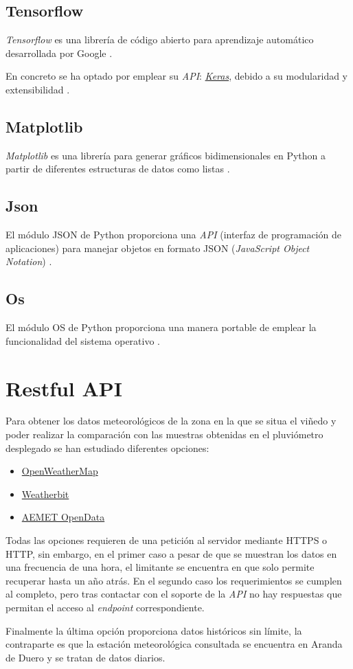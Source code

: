 \subsection{Tensorflow}
\textit{Tensorflow} es una librería de código abierto para aprendizaje automático desarrollada
por Google \cite{eswiki:tensorflow2021}.

En concreto se ha optado por emplear su \textit{API}: \href{https://keras.io/}{\textit{Keras}}, 
debido a su modularidad y extensibilidad \cite{eswiki:keras2022}.

\subsection{Matplotlib}
\textit{Matplotlib} es una librería para generar gráficos bidimensionales en Python a partir de 
diferentes estructuras de datos como listas \cite{eswiki:matplotlib2022}.

\subsection{Json}
El módulo JSON de Python proporciona una \textit{API} (interfaz de programación de 
aplicaciones) para manejar objetos en formato JSON (\textit{JavaScript Object 
Notation}) \cite{python:json2023}.

\subsection{Os}
El módulo OS de Python proporciona una manera portable de emplear la funcionalidad del
sistema operativo \cite{python:os2023}.

\section{Restful API}
Para obtener los datos meteorológicos de la zona en la que se situa el viñedo y poder
realizar la comparación con las muestras obtenidas en el pluviómetro desplegado se han 
estudiado diferentes opciones:
\begin{itemize}
    \item \href{https://openweathermap.org/}{OpenWeatherMap}
    \item \href{https://www.weatherbit.io/}{Weatherbit}
    \item \href{https://www.aemet.es/es/datos_abiertos/AEMET_OpenData}{AEMET OpenData}
\end{itemize}

Todas las opciones requieren de una petición al servidor mediante HTTPS o HTTP, sin 
embargo, en el primer caso a pesar de que se muestran los datos en una frecuencia 
de una hora, el limitante se encuentra en que solo permite recuperar hasta un año atrás.
En el segundo caso los requerimientos se cumplen al completo, pero tras contactar con el
soporte de la \textit{API} no hay respuestas que permitan el acceso al 
\textit{endpoint} correspondiente.

Finalmente la última opción proporciona datos históricos sin límite, la contraparte es
que la estación meteorológica consultada se encuentra en Aranda de Duero y se tratan de
datos diarios.
